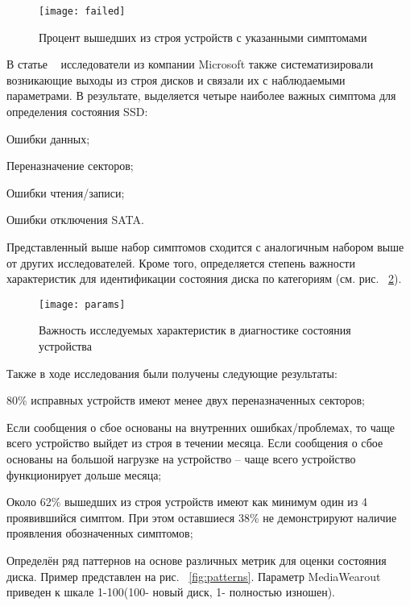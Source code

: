 \begin{figure}[h]
	\centering
	\texttt{[image: failed]}
	\caption{Процент вышедших из строя устройств 
с указанными симптомами}
	\label{fig:failed}
\end{figure}

В статье ~\cite{faildatacenter} исследователи из компании Microsoft также систематизировали возникающие выходы из строя дисков и связали их с наблюдаемыми параметрами. 
В результате, выделяется четыре наиболее важных симптома для определения состояния SSD:
\begin{itemize*}
	\item{Ошибки данных;}
    \item{Переназначение секторов;}
    \item{Ошибки чтения/записи;}
    \item{Ошибки отключения SATA.}
\end{itemize*}
Представленный выше набор симптомов сходится с аналогичным набором выше от других исследователей. 
Кроме того, определяется степень важности характеристик для идентификации состояния диска по категориям (см. рис. ~\ref{fig:params}). 
\begin{figure}[!h]
	\centering
	\texttt{[image: params]}
	\caption{Важность исследуемых характеристик в 
		диагностике состояния устройства}
	\label{fig:params}
\end{figure}

Также в ходе исследования были получены следующие результаты:
\begin{itemize*}
	\item{80\% исправных устройств имеют менее двух переназначенных секторов;}
    \item{Если сообщения о сбое основаны на внутренних ошибках/проблемах, то чаще всего устройство выйдет из строя в течении месяца. Если сообщения о сбое основаны на большой нагрузке на устройство – чаще всего устройство функционирует дольше месяца;}
    \item{Около 62\% вышедших из строя устройств имеют как минимум один из 4 проявившийся симптом. При этом оставшиеся 38\% не демонстрируют наличие проявления обозначенных симптомов;} 
    \item{Определён ряд паттернов на основе различных метрик для оценки состояния диска. Пример представлен на рис. ~\ref{fig:patterns}. Параметр MediaWearout приведен к шкале 1-100(100- новый диск, 1- полностью изношен).}
\end{itemize*}

